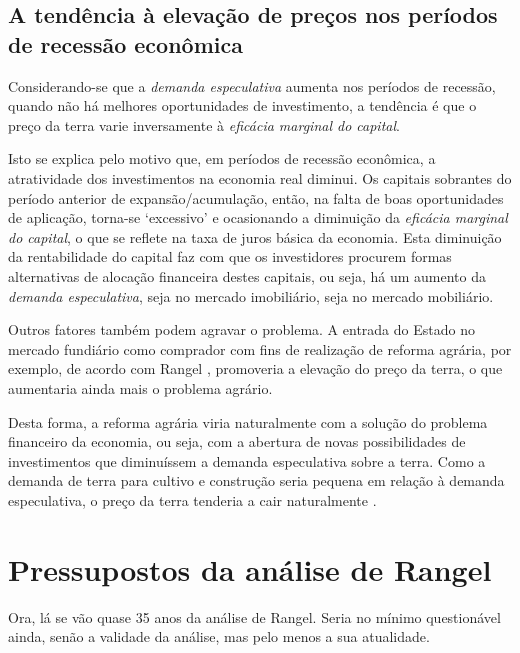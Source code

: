 \documentclass[
	12pt,				%
	oneside,			%
	a4paper,			%
	chapter=TITLE,		%
	section=TITLE,		%
	english,			%
	brazil				%
	]{abntex2}
\begin{document}
\hypertarget{a-tenduxeancia-uxe0-elevauxe7uxe3o-de-preuxe7os-nos-peruxedodos-de-recessuxe3o-econuxf4mica}{%
\subsection{A tendência à elevação de preços nos períodos de recessão econômica}\label{a-tenduxeancia-uxe0-elevauxe7uxe3o-de-preuxe7os-nos-peruxedodos-de-recessuxe3o-econuxf4mica}}

Considerando-se que a \emph{demanda especulativa} aumenta nos períodos de recessão,
quando não há melhores oportunidades de investimento, a tendência é que o preço
da terra varie inversamente à \emph{eficácia marginal do capital}.

Isto se explica pelo motivo que, em períodos de recessão econômica, a
atratividade dos investimentos na economia real diminui. Os capitais sobrantes
do período anterior de expansão/acumulação, então, na falta de boas
oportunidades de aplicação, torna-se `excessivo' e ocasionando a diminuição da
\emph{eficácia marginal do capital}, o que se reflete na taxa de juros básica da
economia. Esta diminuição da rentabilidade do capital faz com que os
investidores procurem formas alternativas de alocação financeira destes
capitais, ou seja, há um aumento da \emph{demanda especulativa}, seja no mercado
imobiliário, seja no mercado mobiliário.

Outros fatores também podem agravar o problema. A entrada do Estado no mercado
fundiário como comprador com fins de realização de reforma agrária, por exemplo,
de acordo com Rangel \autocite*[128]{rangel1985}, promoveria a elevação do preço da
terra, o que aumentaria ainda mais o problema agrário.

Desta forma, a reforma agrária viria naturalmente com a solução do problema
financeiro da economia, ou seja, com a abertura de novas possibilidades de
investimentos que diminuíssem a demanda especulativa sobre a terra. Como a
demanda de terra para cultivo e construção seria pequena em relação à demanda
especulativa, o preço da terra tenderia a cair naturalmente \autocite[139]{rangel1986b}.

\hypertarget{pressupostos-da-anuxe1lise-de-rangel}{%
\section{Pressupostos da análise de Rangel}\label{pressupostos-da-anuxe1lise-de-rangel}}

Ora, lá se vão quase 35 anos da análise de Rangel. Seria no mínimo questionável
ainda, senão a validade da análise, mas pelo menos a sua atualidade.
\end{document}
